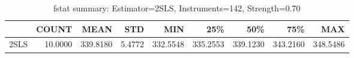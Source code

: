 \begin{table}[ht]
\centering
\caption{fstat summary: Estimator=2SLS, Instruments=142, Strength=0.70}
\begin{tabular}{lrrrrrrrr}
\toprule
 & COUNT & MEAN & STD & MIN & 25\% & 50\% & 75\% & MAX \\
\midrule
2SLS & 10.0000 & 339.8180 & 5.4772 & 332.5548 & 335.2553 & 339.1230 & 343.2160 & 348.5486 \\
\bottomrule
\end{tabular}
\end{table}
